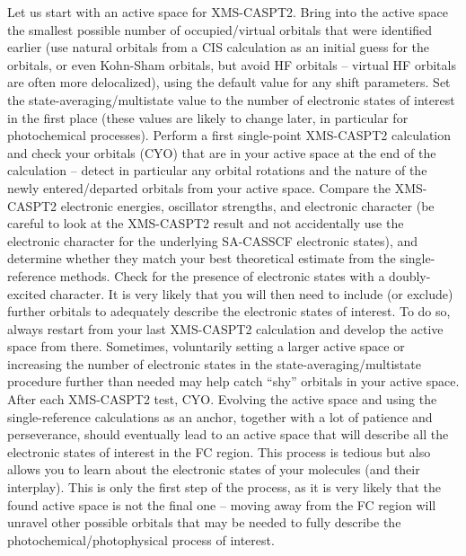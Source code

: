 \documentclass[9pt,bestpractices]{livecoms}
\begin{document}
Let us start with an active space for XMS-CASPT2. Bring into the active space the smallest possible number of occupied/virtual orbitals that were identified earlier (use natural orbitals from a CIS calculation as an initial guess for the orbitals, or even Kohn-Sham orbitals, but avoid HF orbitals -- virtual HF orbitals are often more delocalized), using the default value for any shift parameters. Set the state-averaging/multistate value to the number of electronic states of interest in the first place (these values are likely to change later, in particular for photochemical processes). Perform a first single-point XMS-CASPT2 calculation and check your orbitals (CYO) that are in your active space at the end of the calculation -- detect in particular any orbital rotations and the nature of the newly entered/departed orbitals from your active space. Compare the XMS-CASPT2 electronic energies, oscillator strengths, and electronic character (be careful to look at the XMS-CASPT2 result and not accidentally use the electronic character for the underlying SA-CASSCF electronic states), and determine whether they match your best theoretical estimate from the single-reference methods. Check for the presence of electronic states with a doubly-excited character. It is very likely that you will then need to include (or exclude) further orbitals to adequately describe the electronic states of interest. To do so, always restart from your last XMS-CASPT2 calculation and develop the active space from there. Sometimes, voluntarily setting a larger active space or increasing the number of electronic states in the state-averaging/multistate procedure further than needed may help catch ``shy'' orbitals in your active space. After each XMS-CASPT2 test, CYO. Evolving the active space and using the single-reference calculations as an anchor, together with a lot of patience and perseverance, should eventually lead to an active space that will describe all the electronic states of interest in the FC region. This process is tedious but also allows you to learn about the electronic states of your molecules (and their interplay). This is only the first step of the process, as it is very likely that the found active space is not the final one -- moving away from the FC region will unravel other possible orbitals that may be needed to fully describe the photochemical/photophysical process of interest.  
\end{document}
